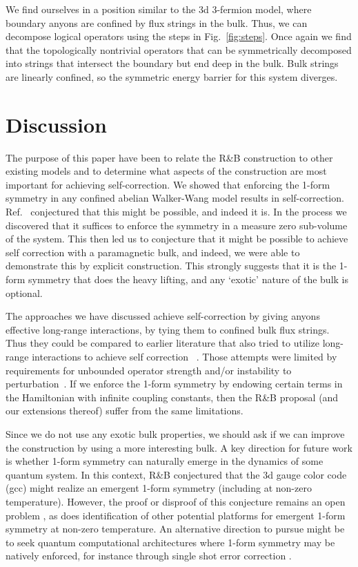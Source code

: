 \documentclass[twocolumn, longbibliography]{revtex4-2}
\begin{document}
We find ourselves in a position similar to the 3d 3-fermion model, where boundary anyons are confined by flux strings in the bulk. Thus, we can decompose logical operators using the steps in Fig.~\ref{fig:steps}. Once again we find that the topologically nontrivial operators that can be symmetrically decomposed into strings that intersect the boundary but end deep in the bulk. Bulk strings are linearly confined, so the symmetric energy barrier for this system diverges.

\section{Discussion}

The  purpose of this paper have been to relate the R\&B construction to other existing models and to determine what aspects of the construction are most important for achieving self-correction. We showed that enforcing the 1-form symmetry in any confined abelian Walker-Wang model results in self-correction. Ref.~\cite{RobertsBartlett} conjectured that this might be possible, and indeed it is. In the process we discovered that it suffices to enforce the symmetry in a measure zero sub-volume of the system. This then led us to conjecture that it might be possible to achieve self correction with a paramagnetic bulk, and indeed, we were able to demonstrate this by explicit construction. This strongly suggests that it is the 1-form symmetry that does the heavy lifting, and any `exotic' nature of the bulk is optional. 

The approaches we have discussed achieve self-correction by giving anyons effective long-range interactions, by tying them to confined bulk flux strings. Thus they could be compared to earlier literature that also tried to utilize long-range interactions to achieve self correction ~\cite{Hamma2009, Chesi2010, Pedrocchi2011, Hutter2012, Wootton2013, Becker2013, Pedrocchi2013, Hutter2014}.
Those attempts were limited by requirements for unbounded operator strength and/or instability to perturbation~\cite{Brown2016, LandonCardinal2015}. If we enforce the 1-form symmetry by endowing certain terms in the Hamiltonian with infinite coupling constants, then the R\&B proposal (and our extensions thereof) suffer from the same limitations. 

Since we do not use any exotic bulk properties, we should ask if we can improve the construction by using a more interesting bulk.
A key direction for future work is  whether 1-form symmetry can naturally emerge in the dynamics of some quantum system. In this context, R\&B conjectured that the 3d gauge color code~\cite{BombinGauge} (gcc) might realize an emergent 1-form symmetry (including at non-zero temperature). However, the proof or disproof of this conjecture remains an open problem \cite{Kubica2018}, as does identification of other potential platforms for emergent 1-form symmetry at non-zero temperature. An alternative direction to pursue might be to seek quantum computational architectures where 1-form symmetry may be natively enforced, for instance through single shot error correction \cite{Roberts2017, BombinSingleShot}. 
\end{document}
